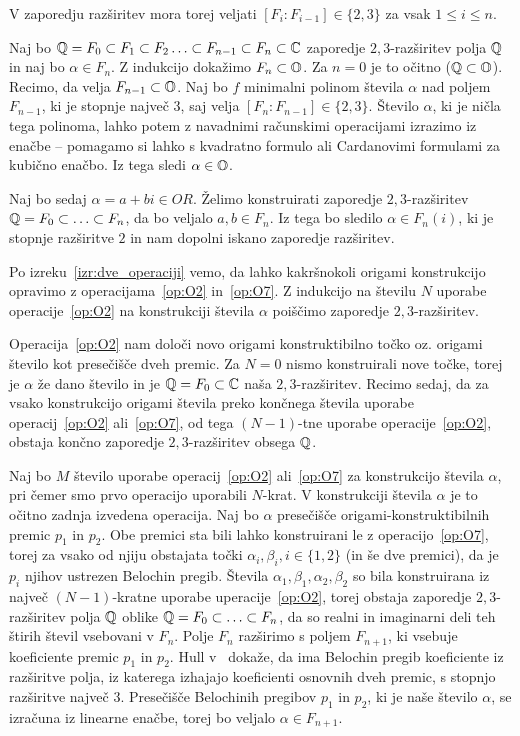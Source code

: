 \begin{dokaz}
    V zaporedju razširitev mora torej veljati $[F_i: F_{i-1}] \in \{2,3\}$ za vsak $ 1 \leq i \leq n$.

    Naj bo $ \mathbb Q = F_0 \subset F_1 \subset F_2 \ldots \subset F_{n-1} \subset F_n \subset \mathbb C $ zaporedje $2,3$-razširitev polja $\mathbb Q$ in naj bo $\alpha \in F_n$. Z indukcijo dokažimo $F_n \subset \mathbb O$. Za $n = 0$ je to očitno ($\mathbb Q \subset \mathbb O$). Recimo, da velja $F_{n-1} \subset \mathbb O$. Naj bo $f$ minimalni polinom števila $\alpha$ nad poljem $  F_{n-1}$, ki je stopnje največ $3$, saj velja $[F_n : F_{n-1}] \in \{2,3\}$. Število $\alpha$, ki je ničla tega polinoma, lahko potem z navadnimi računskimi operacijami izrazimo iz enačbe -- pomagamo si lahko s kvadratno formulo ali Cardanovimi formulami za kubično enačbo. Iz tega sledi $\alpha \in \mathbb O$.

    Naj bo sedaj $\alpha = a+bi \in OR$. Želimo konstruirati zaporedje $2,3$-razširitev $\mathbb Q = F_0 \subset \ldots \subset F_n$, da bo veljalo $a, b \in F_n$. Iz tega bo sledilo $\alpha \in F_n(i)$, ki je stopnje razširitve $2$ in nam dopolni iskano zaporedje razširitev.

    Po izreku~\ref{izr:dve_operaciji} vemo, da lahko kakršnokoli origami konstrukcijo opravimo z operacijama~\ref{op:O2} in~\ref{op:O7}. Z indukcijo na številu $N$ uporabe operacije~\ref{op:O2} na konstrukciji števila $\alpha$ poiščimo zaporedje $2,3$-razširitev.

    Operacija~\ref{op:O2} nam določi novo origami konstruktibilno točko oz. origami število kot presečišče dveh premic. Za $N = 0$ nismo konstruirali nove točke, torej je $\alpha$ že dano število in je $\mathbb Q = F_0 \subset \mathbb C$ naša $2,3$-razširitev. Recimo sedaj, da za vsako konstrukcijo origami števila preko končnega števila uporabe operacij~\ref{op:O2} ali~\ref{op:O7}, od tega $(N-1)$-tne uporabe operacije~\ref{op:O2}, obstaja končno zaporedje $2,3$-razširitev obsega $\mathbb Q$.
    
    Naj bo $M$ število uporabe operacij~\ref{op:O2} ali~\ref{op:O7} za konstrukcijo števila $\alpha$, pri čemer smo prvo operacijo uporabili $N$-krat. V konstrukciji števila $\alpha$ je to očitno zadnja izvedena operacija. Naj bo $\alpha$ presečišče origami-konstruktibilnih premic $p_1$ in $p_2$. Obe premici sta bili lahko konstruirani le z operacijo~\ref{op:O7}, torej za vsako od njiju obstajata točki $\alpha_i, \beta_i, i \in \{1,2\}$ (in še dve premici), da je $p_i$ njihov ustrezen Belochin pregib. Števila $\alpha_1, \beta_1, \alpha_2, \beta_2$ so bila konstruirana iz največ $(N-1)$-kratne uporabe uperacije~\ref{op:O2}, torej obstaja zaporedje $2,3$-razširitev polja $\mathbb Q$ oblike $\mathbb Q = F_0 \subset \ldots \subset F_n$, da so realni in imaginarni deli teh štirih števil vsebovani v $F_n$. Polje $F_n$ razširimo s poljem $F_{n+1}$, ki vsebuje koeficiente premic $p_1$ in $p_2$. Hull v~\cite[str.\ 51--52]{hull2020} dokaže, da ima Belochin pregib koeficiente iz razširitve polja, iz katerega izhajajo koeficienti osnovnih dveh premic, s stopnjo razširitve največ $3$. Presečišče Belochinih pregibov $p_1$ in $p_2$, ki je naše število $\alpha$, se izračuna iz linearne enačbe, torej bo veljalo $\alpha \in F_{n+1}$.
\end{dokaz}

